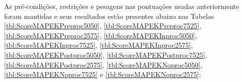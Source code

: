 \documentclass[portugues]{ic-tese}
\begin{document}
As pré-condições, restrições e pesagens nas pontuações usadas anteriormente foram mantidas e seus resultados estão presentes abaixo nas Tabelas \ref{tbl:ScoreMAPEKPreproc5050}, \ref{tbl:ScoreMAPEKPreproc7525}, \ref{tbl:ScoreMAPEKPreproc2575}, \ref{tbl:ScoreMAPEKInproc5050}, \ref{tbl:ScoreMAPEKInproc7525}, \ref{tbl:ScoreMAPEKInproc2575}, \ref{tbl:ScoreMAPEKPostproc5050}, \ref{tbl:ScoreMAPEKPostproc7525}, \ref{tbl:ScoreMAPEKPostproc2575}, \ref{tbl:ScoreMAPEKNoproc5050}, \ref{tbl:ScoreMAPEKNoproc7525} e \ref{tbl:ScoreMAPEKNoproc2575}:

\begin{table}[H]
\begin{center}
  \caption{Melhores opções escolhidas pelo modelo MAPE-K \\ Apenas com redução de viés no dado - 50\% Performance/50\% Fairness}
\label{tbl:ScoreMAPEKPreproc5050}
\end{center}
\end{table}
\end{document}
